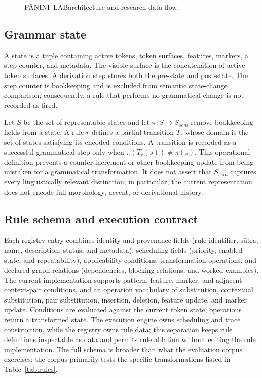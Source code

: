 \documentclass[conference]{IEEEtran}
\newcommand{\system}{P\={A}\d{N}INI--LAB}
\begin{document}
\begin{figure}[t]
  \centering
  
  \caption{\system architecture and research-data flow.}
  \label{fig:architecture}
\end{figure}

\subsection{Grammar state}
A state is a tuple containing active tokens, token surfaces, features, markers, a step counter, and metadata. The visible surface is the concatenation of active token surfaces. A derivation step stores both the pre-state and post-state. The step counter is bookkeeping and is excluded from semantic state-change comparison; consequently, a rule that performs no grammatical change is not recorded as fired.

Let $S$ be the set of representable states and let $\pi:S\rightarrow S_{sem}$ remove bookkeeping fields from a state. A rule $r$ defines a partial transition $T_r$ whose domain is the set of states satisfying its encoded conditions. A transition is recorded as a successful grammatical step only when $\pi(T_r(s))\neq\pi(s)$. This operational definition prevents a counter increment or other bookkeeping update from being mistaken for a grammatical transformation. It does not assert that $S_{sem}$ captures every linguistically relevant distinction; in particular, the current representation does not encode full morphology, accent, or derivational history.

\subsection{Rule schema and execution contract}
Each registry entry combines identity and provenance fields (rule identifier, s\=utra, name, description, status, and metadata), scheduling fields (priority, enabled state, and repeatability), applicability conditions, transformation operations, and declared graph relations (dependencies, blocking relations, and worked examples). The current implementation supports pattern, feature, marker, and adjacent context-pair conditions, and an operation vocabulary of substitution, contextual substitution, pair substitution, insertion, deletion, feature update, and marker update. Conditions are evaluated against the current token state; operations return a transformed state. The execution engine owns scheduling and trace construction, while the registry owns rule data; this separation keeps rule definitions inspectable as data and permits rule ablation without editing the rule implementation. The full schema is broader than what the evaluation corpus exercises: the corpus primarily tests the specific transformations listed in Table~\ref{tab:rules}.
\end{document}
